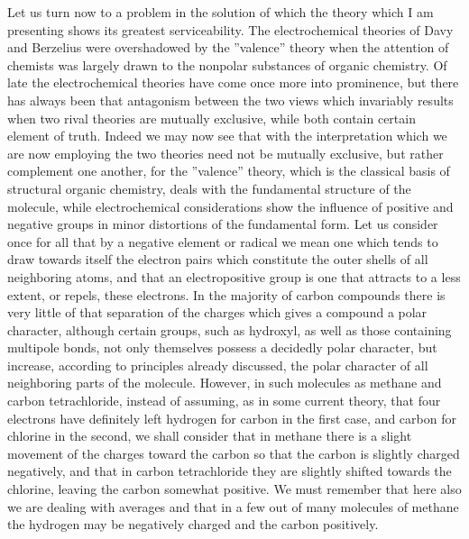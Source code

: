 \documentclass[11pt]{memoir}
\begin{document}
Let us turn now to a problem in the solution of which the theory which I am presenting shows its greatest serviceability.  The electrochemical theories of Davy and Berzelius were overshadowed by the ''valence'' theory when the attention of chemists was largely drawn to the nonpolar substances of organic chemistry.  Of late the electrochemical theories have come once more into prominence, but there has always been that antagonism between the two views which invariably results when two rival theories are mutually exclusive, while both contain certain element of truth.  Indeed we may now see that with the interpretation which we are now employing the two theories need not be mutually exclusive, but rather complement one another, for the ''valence'' theory, which is the classical basis of structural organic chemistry, deals with the fundamental structure of the molecule, while electrochemical considerations show the influence of positive and negative groups in minor distortions of the fundamental form.  Let us consider once for all that by a negative element or radical we mean one which tends to draw towards itself the electron pairs which constitute the outer shells of all neighboring atoms, and that an electropositive group is one that attracts to a less extent, or repels, these electrons.  In the majority of carbon compounds there is very little of that separation of the charges which gives a compound a polar character, although certain groups, such as hydroxyl, as well as those containing multipole bonds, not only themselves possess a decidedly polar character, but increase, according to principles already discussed, the polar character of all neighboring parts of the molecule.  However, in such molecules as methane and carbon tetrachloride, instead of assuming, as in some current theory, that four electrons have definitely left hydrogen for carbon in the first case, and carbon for chlorine in the second, we shall consider that in methane there is a slight movement of the charges toward the carbon so that the carbon is slightly charged negatively, and that in carbon tetrachloride they are slightly shifted towards the chlorine, leaving the carbon somewhat positive.  We must remember that here also we are dealing with averages and that in a few out of many molecules of methane the hydrogen may be negatively charged and the carbon positively.
\end{document}
